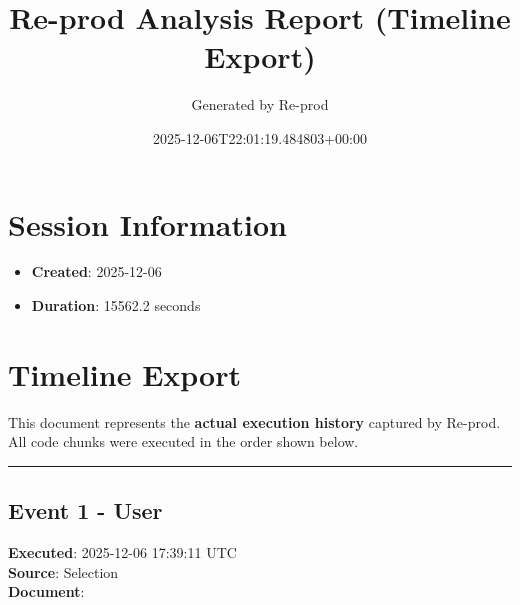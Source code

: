 \documentclass[
  11pt,
]{article}
\title{Re-prod Analysis Report (Timeline Export)}
\author{Generated by Re-prod}
\date{2025-12-06T22:01:19.484803+00:00}
\providecommand{\tightlist}{%
  \setlength{\itemsep}{0pt}\setlength{\parskip}{0pt}}
\begin{document}
\maketitle

{
\setcounter{tocdepth}{2}
\tableofcontents
}
\section{Session Information}\label{session-information}

\begin{itemize}
\tightlist
\item
  \textbf{Created}: 2025-12-06
\item
  \textbf{Duration}: 15562.2 seconds
\end{itemize}

\section{Timeline Export}\label{timeline-export}

This document represents the \textbf{actual execution history} captured
by Re-prod. All code chunks were executed in the order shown below.

\begin{center}\rule{0.5\linewidth}{0.5pt}\end{center}

\subsection{Event 1 - User}\label{event-1---user}

\textbf{Executed}: 2025-12-06 17:39:11 UTC\\
\textbf{Source}: Selection\\
\textbf{Document}:
\end{document}
